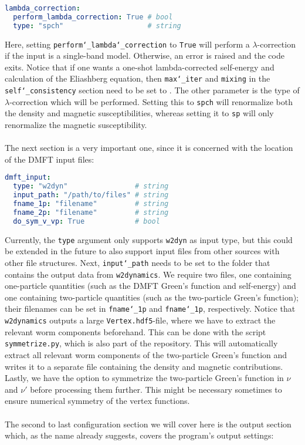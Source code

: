 \documentclass[../../main.tex]{subfiles}
\begin{document}
\begin{minipage}{\textwidth}%
\begin{lstlisting}[language=yaml]
lambda_correction:
  perform_lambda_correction: True # bool
  type: "spch"                    # string
\end{lstlisting}
\end{minipage}
Here, setting \texttt{perform\char`_lambda\char`_correction} to \texttt{True} will perform a $\lambda$-correction if the input is a single-band model. Otherwise, an error is raised and the code exits. Notice that if one wants a one-shot lambda-corrected self-energy and calculation of the Eliashberg equation, then \texttt{max\char`_iter} and \texttt{mixing} in the \texttt{self\char`_consistency} section need to be set to . The other parameter is the type of $\lambda$-correction which will be performed. Setting this to \texttt{spch} will renormalize both the density and magnetic susceptibilities, whereas setting it to \texttt{sp} will only renormalize the magnetic susceptibility.
\\\\
The next section is a very important one, since it is concerned with the location of the DMFT input files:

\begin{minipage}{\textwidth}%
\begin{lstlisting}[language=yaml]
dmft_input:
  type: "w2dyn"                # string
  input_path: "/path/to/files" # string           
  fname_1p: "filename"         # string
  fname_2p: "filename"         # string
  do_sym_v_vp: True            # bool
\end{lstlisting}
\end{minipage}
Currently, the \texttt{type} argument only supports \texttt{w2dyn} as input type, but this could be extended in the future to also support input files from other sources with other file structures. Next, \texttt{input\char`_path} needs to be set to the folder that contains the output data from \texttt{w2dynamics}. We require two files, one containing one-particle quantities (such as the DMFT Green's function and self-energy) and one containing two-particle quantities (such as the two-particle Green's function); their filenames can be set in \texttt{fname\char`_1p} and \texttt{fname\char`_1p}, respectively. Notice that \texttt{w2dynamics} outputs a large \texttt{Vertex.hdf5}-file, where we have to extract the relevant worm components beforehand. This can be done with the script \texttt{symmetrize.py}, which is also part of the repository. This will automatically extract all relevant worm components of the two-particle Green's function and writes it to a separate file containing the density and magnetic contributions. Lastly, we have the option to symmetrize the two-particle Green's function in $\nu$ and $\nu'$ before processing them further. This might be necessary sometimes to ensure numerical symmetry of the vertex functions.
\\\\
The second to last configuration section we will cover here is the output section which, as the name already suggests, covers the program's output settings: 
 
\end{document}

